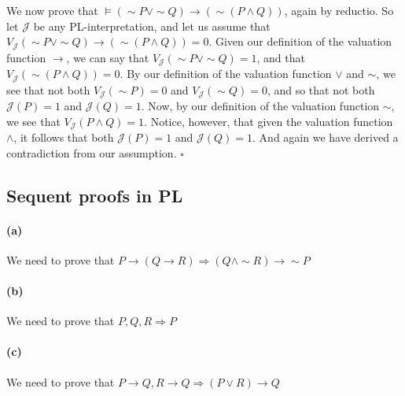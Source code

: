 \documentclass[sloppy, journal, git, bytitle]{humapap}
\begin{document}
We now prove that $\vDash (\sim P\vee\sim Q)\rightarrow(\sim(P\wedge Q))$, again by reductio. 
So let $\mathcal{J}$ be any PL-interpretation, and let us assume that 
$V\mathcal{_J}(\sim P\vee\sim Q)\rightarrow(\sim(P\wedge Q))=0$. 
Given our definition of the valuation function $\rightarrow$, we can say that 
$V\mathcal{_J}(\sim P\vee\sim Q)=1$, and that
$V\mathcal{_J}(\sim(P\wedge Q))=0$. 
By our definition of the valuation function $\vee$ and $\sim$, we see that not both 
$V\mathcal{_J}(\sim P)=0$ and 
$V\mathcal{_J}(\sim Q)=0$, and so that not both 
$\mathcal{J}(P)=1$ and 
$\mathcal{J}(Q)=1$. 
Now, by our definition of the valuation function $\sim$, we see that 
$V\mathcal{_J}(P\wedge Q)=1$.
Notice, however, that given the valuation function $\wedge$, 
it follows that both 
$\mathcal{J}(P)=1$ and 
$\mathcal{J}(Q)=1$.
And again we have derived a contradiction from our assumption. $\square$ 

\subsection{Sequent proofs in PL}

\paragraph{(a)} We need to prove that $P\rightarrow (Q\rightarrow R)\Rightarrow (Q\wedge\sim R)\rightarrow\sim P$

\paragraph{(b)} We need to prove that $P, Q, R\Rightarrow P$

\paragraph{(c)} We need to prove that $P\rightarrow Q, R\rightarrow Q \Rightarrow (P\vee R)\rightarrow Q$


 


\standardbib
\end{document}
